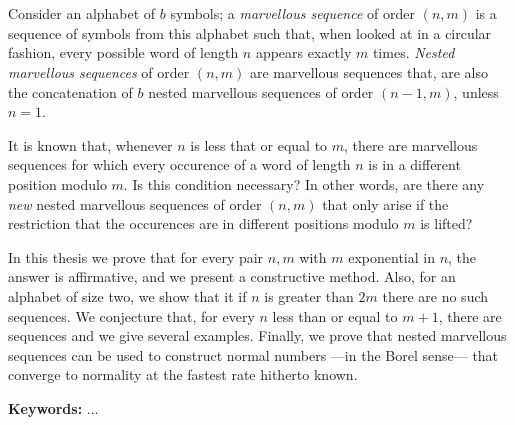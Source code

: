 \chapter*{\runtitle}

Consider an alphabet of $b$ symbols; a \emph{marvellous sequence} of
order $(n,m)$ is a sequence of symbols from this alphabet such that,
when looked at in a circular fashion, every possible word of length $n$ appears
exactly $m$ times.
\emph{Nested marvellous sequences} of order $(n,m)$ are marvellous
sequences that, are also the concatenation of $b$ nested
marvellous sequences of order $(n-1,m)$, unless $n = 1$.

It is known that, whenever $n$ is less that or equal to $m$, there are marvellous
sequences for which every occurence of a word of length $n$ is in a different
position modulo $m$. Is this condition necessary? In other words,
are there any \emph{new} nested marvellous sequences of order $(n,m)$ that only
arise if the restriction that the occurences are in different positions modulo
$m$ is lifted?

In this thesis we prove that for every pair $n,m$ with $m$ exponential in $n$,
the answer is affirmative, and we present a constructive method.
Also, for an alphabet of size two, we show that it if $n$ is greater than $2m$
there are no such sequences.
We conjecture that, for every $n$ less than or equal to $m + 1$, there are
sequences and we give several examples.
Finally, we prove that nested marvellous sequences can be used to construct
normal numbers ---in the Borel sense--- that converge to normality at the
fastest rate hitherto known.

\bigskip

\noindent\textbf{Keywords:} ...
